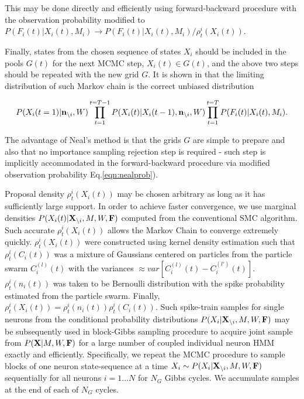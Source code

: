 This may be done directly and efficiently using forward-backward procedure with the observation probability modified to $P(F_i(t)|X_i(t), M_i)\rightarrow P(F_i(t)|X_i(t), M_i)/{\rho^i_t(X_i(t))}$.

Finally, states from the chosen sequence of states $X_i$ should be included in the pools $G(t)$ for the next MCMC step, $X_i(t)\in G(t)$, and the above two steps should be repeated with the new grid $G$. It is shown in \cite{NBR03} that the limiting distribution of such Markov chain is the correct unbiased distribution

\begin{equation}
P(X_i(t=1)|{\bf n}_{\backslash i}, W)\prod\limits_{t=1}^{t=T-1}P(X_i(t)|X_i(t-1), {\bf n}_{\backslash i}, W)\prod\limits_{t=1}^{t=T}P(F_i(t)|X_i(t), M_i).
\end{equation}

The advantage of Neal's method is that the grids $G$ are simple to prepare and also that no importance sampling rejection step is required - such step is implicitly accommodated in the forward-backward procedure via modified observation probability Eq.\eqref{eqn:nealprob}).

Proposal density $\rho^i_t(X_i(t))$ may be chosen arbitrary as long as it has sufficiently large support.  In order to achieve faster convergence, we use marginal densities $P(X_i(t)|{\bf X}_{\backslash i}, M, W, {\bf F})$ computed from the conventional SMC algorithm. Such accurate $\rho^i_t(X_i(t))$ allows the Markov Chain to converge extremely quickly.  $\rho^i_t(X_i(t))$ were constructed using kernel density estimation such that $\rho^i_t(C_i(t))$ was a mixture of Gaussians centered on particles from the particle swarm $C_i^{(l)}(t)$ with the variances $\approx var\left[C_i^{(l)}(t)-C_i^{(l')}(t) \right]$. $\rho^i_t(n_i(t))$ was taken to be Bernoulli distribution with the spike probability estimated from the particle swarm. Finally, $\rho^i_t(X_i(t)) = \rho^i_t(n_i(t)) \rho^i_t(C_i(t))$.  Such spike-train samples for single neurons from the conditional probability distributions $P(X_i|{\bf X}_{\backslash i}, M, W, {\bf F})$ may be subsequently used in block-Gibbs sampling procedure to acquire joint sample from $P({\bf X}|M, W, {\bf F})$ for a large number of coupled individual neuron HMM exactly and efficiently.  Specifically, we repeat the MCMC procedure to sample blocks of one neuron state-sequence at a time $X_i\sim P(X_{i}|{\bf X}_{\backslash i}, M, W, {\bf F})$ sequentially for all neurons $i=1\ldots N$ for $N_G$ Gibbs cycles.  We accumulate samples at the end of each of $N_G$ cycles.

